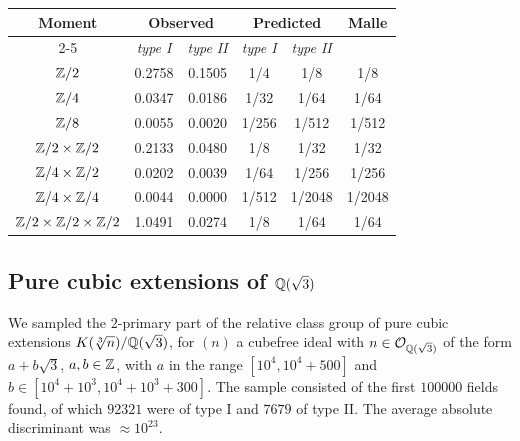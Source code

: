 \documentclass[11pt,a4paper]{amsart}
\def\Z{{\rm \mathbb{Z}}}
\def\Q{{\rm \mathbb{Q}}}
\def\O{{\rm \mathcal{O}}}
\numberwithin{equation}{section}
\begin{document}
\begin{center}
\begin{tabular}{|c|c||c|c||c|c|}\hline
\multirow{2}{*}{\textbf{Moment}} & \multicolumn{2}{c|}{\textbf{Observed}} & \multicolumn{2}{c|}{\textbf{Predicted}} & \multirow{2}{*}{\textbf{Malle}} \\ \cline{2-5}
& \textit{type I} & \textit{type II} & \textit{type I} & \textit{type II} &  \\ \hline 
$\Z/2$ & 0.2758 & 0.1505 & \cellcolor{lightgray} 1/4 & 1/8 & 1/8 \\ \hline 
$\Z/4$ & 0.0347 & 0.0186 & 1/32 & 1/64 & 1/64 \\ \hline
$\Z/8$ & 0.0055 & 0.0020 & 1/256 & 1/512 & 1/512 \\ \hline
$\Z/2 \times \Z/2$ & 0.2133 & 0.0480 & \cellcolor{lightgray} 1/8 & 1/32 & 1/32 \\ \hline
$\Z/4 \times \Z/2$ & 0.0202 & 0.0039 & 1/64 & 1/256 & 1/256 \\ \hline
$\Z/4 \times \Z/4$ & 0.0044 &  0.0000 & 1/512 & 1/2048 & 1/2048 \\ \hline
$\Z/2 \times \Z/2 \times \Z/2$ & 1.0491 & 0.0274 & \cellcolor{lightgray} 1/8 & 1/64 & 1/64 \\ \hline
\end{tabular}
\end{center}


\subsection{Pure cubic extensions of $\Q(\sqrt{3})$} \label{tbl: pure cubic extensions of Q(sqrt(3))}

We sampled the $2$-primary part of the relative class group of pure cubic extensions $K(\sqrt[3]{n})/\Q(\sqrt{3})$, for $(n)$ a cubefree ideal with $n \in \O_{\Q(\sqrt{3})}$ of the form $a+b\sqrt{3}$, $a,b \in \Z$, with $a$ in the range $[10^4,10^4+500]$ and $b \in [10^4+10^3,10^4+10^3+300]$. The sample consisted of the first $100000$ fields found, of which $92321$ were of type I and $7679$ of type II. The average absolute discriminant was $\approx 10^{23}$.  \\
\end{document}
